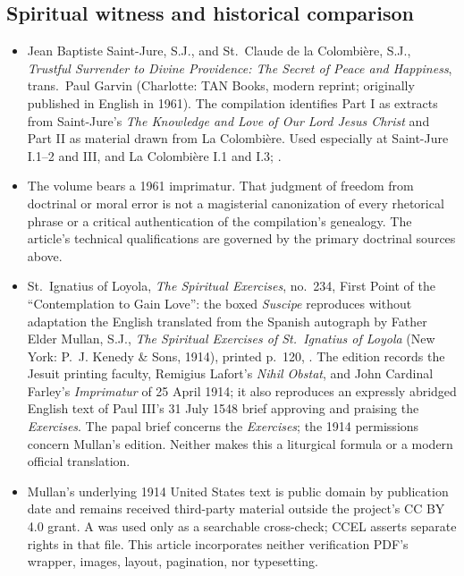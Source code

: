 \subsection*{Spiritual witness and historical comparison}

{\fontsize{8.6}{9.6}\selectfont
\begin{itemize}[itemsep=0pt,parsep=0pt,topsep=0.05em]
\item Jean Baptiste Saint-Jure, S.J., and St.~Claude de la Colombière, S.J., \emph{Trustful Surrender to Divine Providence: The Secret of Peace and Happiness}, trans.~Paul Garvin (Charlotte: TAN Books, modern reprint; originally published in English in 1961). The compilation identifies Part I as extracts from Saint-Jure's \emph{The Knowledge and Love of Our Lord Jesus Christ} and Part II as material drawn from La Colombière. Used especially at Saint-Jure I.1--2 and III, and La Colombière I.1 and I.3; .
\item The volume bears a 1961 imprimatur. That judgment of freedom from doctrinal or moral error is not a magisterial canonization of every rhetorical phrase or a critical authentication of the compilation's genealogy. The article's technical qualifications are governed by the primary doctrinal sources above.
\item St.~Ignatius of Loyola, \emph{The Spiritual Exercises}, no.~234, First Point of the ``Contemplation to Gain Love'': the boxed \emph{Suscipe} reproduces without adaptation the English translated from the Spanish autograph by Father Elder Mullan, S.J., \emph{The Spiritual Exercises of St.~Ignatius of Loyola} (New York: P.~J. Kenedy \& Sons, 1914), printed p.~120, . The edition records the Jesuit printing faculty, Remigius Lafort's \emph{Nihil Obstat}, and John Cardinal Farley's \emph{Imprimatur} of 25 April 1914; it also reproduces an expressly abridged English text of Paul III's 31 July 1548 brief approving and praising the \emph{Exercises}. The papal brief concerns the \emph{Exercises}; the 1914 permissions concern Mullan's edition. Neither makes this a liturgical formula or a modern official translation.
\item Mullan's underlying 1914 United States text is public domain by publication date and remains received third-party material outside the project's CC BY 4.0 grant. A  was used only as a searchable cross-check; CCEL asserts separate rights in that file. This article incorporates neither verification PDF's wrapper, images, layout, pagination, nor typesetting.

\end{itemize}}
